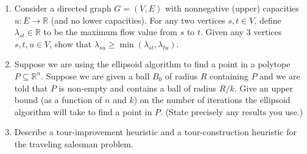 \documentclass[12pt]{article}
\begin{document}
\begin{enumerate}
\iffalse
\item
Suppose that you are given an oracle (i.e.~a black-box algorithm) which given a polyhedron $P=\{x:
Fx\leq g\}$ gives you a  feasible solution in $P$ or asserts that
$P=\emptyset$. Show that using a {\it single call} to this oracle one
can obtain an optimum solution for the LP
$$\min\{c^T x: A x =b, x\geq 0\},$$
assuming that this LP is feasible and bounded. 
\fi
\item
Consider a directed graph $G=(V,E)$ with nonnegative (upper) capacities $u: E \rightarrow {\mathbb R}$ (and no lower capacities). For any two vertices $s, t\in V$, define $\lambda_{st}\in {\mathbb R}$ to be the maximum flow value from $s$ to $t$. Given any 3 vertices $s, t, u\in V$, show that $\lambda_{su} \geq \min(\lambda_{st},\lambda_{tu})$. 

\iffalse
\newpage
\item
Consider the complete (i.e.~all possible edges are present) graph $K_n=(V,E)$ on $n$ vertices (and ${n \choose 2}$ edges). Consider the polytope $P_n$ defined as the convex hull of incidence vectors of 1-trees. What is the dimension of $P_n$? Justify.
\fi


\newpage
\item
Suppose we are using the ellipsoid algorithm to find a point in a polytope $P\subseteq {\mathbb R}^n$. Suppose we are given a ball $B_0$ of radius $R$ containing $P$ and we are told that $P$ is non-empty and contains a ball of radius $R/k$. Give an upper bound (as a function of $n$ and $k$) on the number of iterations the ellipsoid algorithm will take to find a point in $P$. (State precisely any results you use.)

\newpage
\item
Describe a tour-improvement heuristic and a tour-construction heuristic for the traveling salesman problem. 


\iffalse
\newpage
\item
Define what is a totally unimodular matrix $A$. Is the following matrix $A$ totally unimodular? Justify. 

\[ 
A=\left(\begin{array}{ccccccc}
0 & 1 & 1 & 0 & 0 & 1 & 0 \\
1 & 1 & 1 & 0 & 0 & 1 & 1 \\
1 & 1 & 1 & 0 & 1 & 1 & 1 \\
1 & 1 & 1 & 1 & 1 & 1 & 1 
\end{array} \right)
\]
\fi


\end{enumerate}
\end{document}
